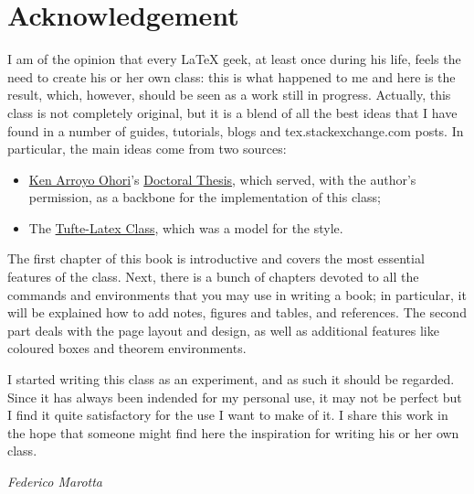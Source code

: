 \chapter*{Acknowledgement}

I am of the opinion that every \LaTeX\xspace geek, at least once during 
his life, feels the need to create his or her own class: this is what 
happened to me and here is the result, which, however, should be seen as 
a work still in progress. Actually, this class is not completely 
original, but it is a blend of all the best ideas that I have found in a 
number of guides, tutorials, blogs and tex.stackexchange.com posts. In 
particular, the main ideas come from two sources:

\begin{itemize}
	\item \href{https://3d.bk.tudelft.nl/ken/en/}{Ken Arroyo Ohori}'s 
	\href{https://3d.bk.tudelft.nl/ken/en/nl/ken/en/2016/04/17/a-1.5-column-layout-in-latex.html}{Doctoral 
	Thesis}, which served, with the author's permission, as a backbone 
	for the implementation of this class;
	\item The 
		\href{https://github.com/Tufte-LaTeX/tufte-latex}{Tufte-Latex 
			Class}, which was a model for the style.
\end{itemize}

The first chapter of this book is introductive and covers the most 
essential features of the class. Next, there is a bunch of chapters 
devoted to all the commands and environments that you may use in writing 
a book; in particular, it will be explained how to add notes, figures 
and tables, and references. The second part deals with the page layout 
and design, as well as additional features like coloured boxes and 
theorem environments.

I started writing this class as an experiment, and as such it should be 
regarded. Since it has always been indended for my personal use, it may 
not be perfect but I find it quite satisfactory for the use I want to 
make of it. I share this work in the hope that someone might find here 
the inspiration for writing his or her own class.

\begin{flushright}
	\textit{Federico Marotta}
\end{flushright}
